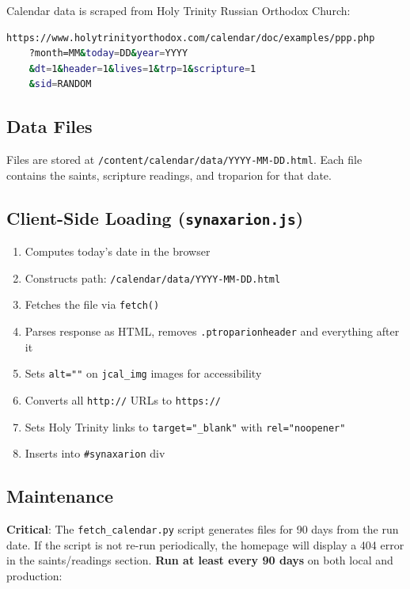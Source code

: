\documentclass[12pt]{article}
\begin{document}
Calendar data is scraped from Holy Trinity Russian Orthodox Church:

\begin{lstlisting}[language=bash,numbers=none]
https://www.holytrinityorthodox.com/calendar/doc/examples/ppp.php
    ?month=MM&today=DD&year=YYYY
    &dt=1&header=1&lives=1&trp=1&scripture=1
    &sid=RANDOM
\end{lstlisting}

\subsection{Data Files}

Files are stored at \texttt{/content/calendar/data/YYYY-MM-DD.html}. Each file contains the saints, scripture readings, and troparion for that date.

\subsection{Client-Side Loading (\texttt{synaxarion.js})}

\begin{enumerate}
    \item Computes today's date in the browser
    \item Constructs path: \texttt{/calendar/data/YYYY-MM-DD.html}
    \item Fetches the file via \texttt{fetch()}
    \item Parses response as HTML, removes \texttt{.ptroparionheader} and everything after it
    \item Sets \texttt{alt=""} on \texttt{jcal\_img} images for accessibility
    \item Converts all \texttt{http://} URLs to \texttt{https://}
    \item Sets Holy Trinity links to \texttt{target="\_blank"} with \texttt{rel="noopener"}
    \item Inserts into \texttt{\#synaxarion} div
\end{enumerate}

\subsection{Maintenance}

\textbf{Critical}: The \texttt{fetch\_calendar.py} script generates files for 90 days from the run date. If the script is not re-run periodically, the homepage will display a 404 error in the saints/readings section. \textbf{Run at least every 90 days} on both local and production:
\end{document}
